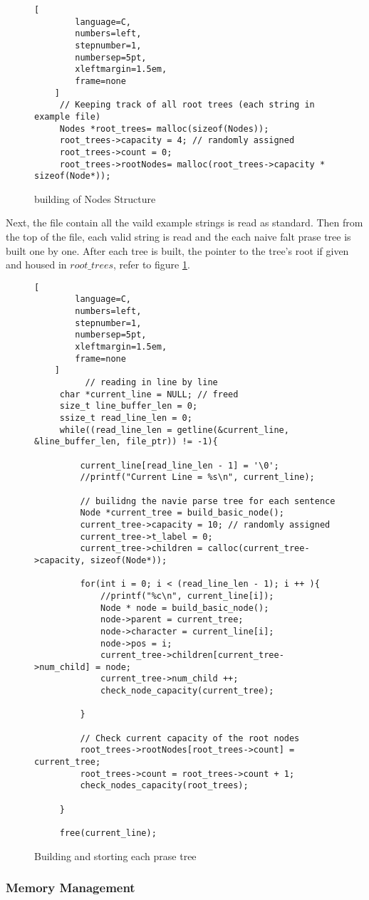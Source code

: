 \begin{figure}[H]
    \begin{lstlisting}[
        language=C,
        numbers=left,
        stepnumber=1,
        numbersep=5pt,
        xleftmargin=1.5em,
        frame=none
    ]
     // Keeping track of all root trees (each string in example file)
     Nodes *root_trees= malloc(sizeof(Nodes)); 
     root_trees->capacity = 4; // randomly assigned
     root_trees->count = 0;
     root_trees->rootNodes= malloc(root_trees->capacity * sizeof(Node*));

    \end{lstlisting}

\caption{building of Nodes Structure}
\label{fig:rootNodes}
\end{figure}

Next, the file contain all the vaild example strings is read as standard. Then from the top of the file, each valid string is read and the each naive falt prase tree is built one by one. After each tree is built, the pointer to the tree's root if given and housed in $root\_trees$, refer to figure \ref{fig:rootNodes}.

\begin{figure}[H]
    \begin{lstlisting}[
        language=C,
        numbers=left,
        stepnumber=1,
        numbersep=5pt,
        xleftmargin=1.5em,
        frame=none
    ]
          // reading in line by line
     char *current_line = NULL; // freed
     size_t line_buffer_len = 0;
     ssize_t read_line_len = 0;
     while((read_line_len = getline(&current_line, &line_buffer_len, file_ptr)) != -1){

         current_line[read_line_len - 1] = '\0';
         //printf("Current Line = %s\n", current_line);

         // builidng the navie parse tree for each sentence
         Node *current_tree = build_basic_node();
         current_tree->capacity = 10; // randomly assigned
         current_tree->t_label = 0;
         current_tree->children = calloc(current_tree->capacity, sizeof(Node*));

         for(int i = 0; i < (read_line_len - 1); i ++ ){
             //printf("%c\n", current_line[i]);
             Node * node = build_basic_node();
             node->parent = current_tree;
             node->character = current_line[i];
             node->pos = i;
             current_tree->children[current_tree->num_child] = node;
             current_tree->num_child ++;
             check_node_capacity(current_tree);

         }

         // Check current capacity of the root nodes
         root_trees->rootNodes[root_trees->count] = current_tree;
         root_trees->count = root_trees->count + 1;
         check_nodes_capacity(root_trees);

     }

     free(current_line);

    \end{lstlisting}

\caption{Building and storting each prase tree}
\label{fig:eachParseTree}
\end{figure}

\subsubsection{Memory Management}